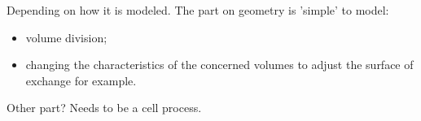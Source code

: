 \textcolor[rgb]{1.00,0.00,0.00}{Depending on how it is modeled. The part on geometry is 'simple' to model:
\begin{itemize}
  \item volume division;
  \item changing the characteristics of the concerned volumes to adjust the surface of exchange for example.
\end{itemize}
Other part? Needs to be a cell process.}